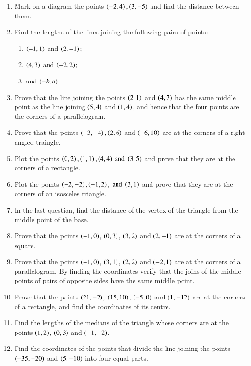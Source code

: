 \begin{enumerate}[1.]
\item Mark on a diagram the points $\left(-2,4\right), \left(3,-5\right)$ and find the distance between them.

%
\item
Find the lengths of the lines joining the following pairs of points:
\begin{enumerate}
\item $\left(-1,1\right)$ and $\left(2,-1\right)$;
\item $\left(4,3\right)$ and $\left(-2,2\right)$;
\item {} and $\left(-b,a\right)$.
\end{enumerate}

\item Prove that the line joining the points $\left(2,1\right)$ and $\left(4,7\right)$ has the same middle point as the line joining $\left(5,4\right)$ and $\left(1,4\right)$,
and hence that the four points are the corners of a parallelogram.
\item Prove that the points $\left(-3,-4\right), \left(2,6\right)$ and $\left(-6,10\right)$  are at the corners of a right-angled
traingle.
\item Plot the points $\left(0,2\right),\left(1,1\right),\left(4,4\right)\text{ and }\left(3,5\right)$ and prove that they are at the corners of a rectangle.
\item Plot the points $\left(-2,-2\right),\left(-1,2\right),\text{ and }\left(3,1\right)$ and prove that they are at the corners of an isosceles triangle.
\item In the last question, find the distance of the vertex of the triangle from the middle point of the base.
\item Prove that the points $\left(-1,0\right)$, $\left(0,3\right)$, $\left(3,2\right)$ and $\left(2,-1\right)$ are at the corners of a square.
\item Prove that the points $\left(-1,0\right)$, $\left(3,1\right)$, $\left(2,2\right)$  and $\left(-2,1\right)$ are at the corners of a parallelogram. By finding
the coordinates verify that the joins of the middle points of pairs of opposite sides have the same middle point.
\item Prove that the points $\left(21,-2\right)$, $\left(15,10\right)$, $\left(-5,0\right)$  and $\left(1,-12\right)$ are at the corners of a rectangle, and find the
coordinates of its centre.
\item Find the lengths of the medians of the triangle whose corners are at the points $\left(1,2\right)$, $\left(0,3\right)$ and $\left(-1,-2\right)$.
\item Find the coordinates of the points that divide the line joining the points $\left(-35,-20\right)$ and $\left(5,-10\right)$ into four equal parts.

\end{enumerate}
